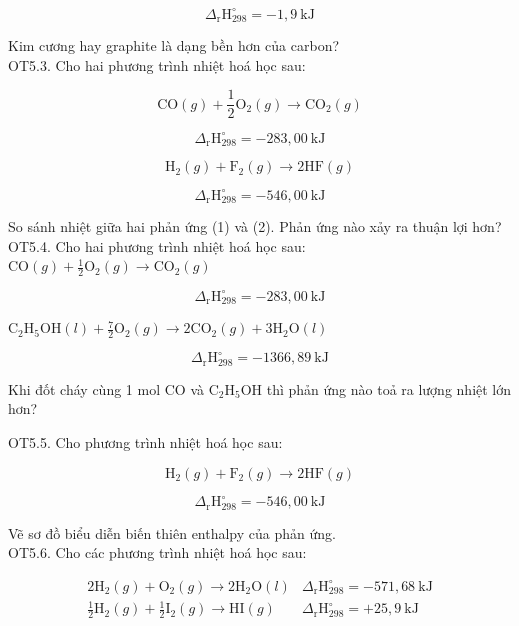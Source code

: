 \documentclass[10pt]{article}
\begin{document}
$$
\Delta_{\mathrm{r}} \mathrm{H}_{298}^{\circ}=-1,9 \mathrm{~kJ}
$$

Kim cương hay graphite là dạng bền hơn của carbon?\\
OT5.3. Cho hai phương trình nhiệt hoá học sau:


\begin{equation*}
\mathrm{CO}(g)+\frac{1}{2} \mathrm{O}_{2}(g) \rightarrow \mathrm{CO}_{2}(g) \tag{1}
\end{equation*}


$$
\Delta_{\mathrm{r}} \mathrm{H}_{298}^{\circ}=-283,00 \mathrm{~kJ}
$$


\begin{equation*}
\mathrm{H}_{2}(g)+\mathrm{F}_{2}(g) \rightarrow 2 \mathrm{HF}(g) \tag{2}
\end{equation*}


$$
\Delta_{\mathrm{r}} \mathrm{H}_{298}^{\circ}=-546,00 \mathrm{~kJ}
$$

So sánh nhiệt giữa hai phản ứng (1) và (2). Phản ứng nào xảy ra thuận lợi hơn?\\
OT5.4. Cho hai phương trình nhiệt hoá học sau:\\
$\mathrm{CO}(g)+\frac{1}{2} \mathrm{O}_{2}(g) \rightarrow \mathrm{CO}_{2}(g)$

$$
\Delta_{\mathrm{r}} \mathrm{H}_{298}^{\circ}=-283,00 \mathrm{~kJ}
$$

$\mathrm{C}_{2} \mathrm{H}_{5} \mathrm{OH}(l)+\frac{7}{2} \mathrm{O}_{2}(g) \rightarrow 2 \mathrm{CO}_{2}(g)+3 \mathrm{H}_{2} \mathrm{O}(l)$

$$
\Delta_{\mathrm{r}} \mathrm{H}_{298}^{\circ}=-1366,89 \mathrm{~kJ}
$$

Khi đốt cháy cùng 1 mol CO và $\mathrm{C}_{2} \mathrm{H}_{5} \mathrm{OH}$ thì phản ứng nào toả ra lượng nhiệt lớn hơn?

OT5.5. Cho phương trình nhiệt hoá học sau:

$$
\mathrm{H}_{2}(g)+\mathrm{F}_{2}(g) \rightarrow 2 \mathrm{HF}(g)
$$

$$
\Delta_{\mathrm{r}} \mathrm{H}_{298}^{\circ}=-546,00 \mathrm{~kJ}
$$

Vẽ sơ đồ biểu diễn biến thiên enthalpy của phản ứng.\\
OT5.6. Cho các phương trình nhiệt hoá học sau:

$$
\begin{array}{ll}
2 \mathrm{H}_{2}(g)+\mathrm{O}_{2}(g) \rightarrow 2 \mathrm{H}_{2} \mathrm{O}(l) & \Delta_{\mathrm{r}} \mathrm{H}_{298}^{\circ}=-571,68 \mathrm{~kJ} \\
\frac{1}{2} \mathrm{H}_{2}(g)+\frac{1}{2} \mathrm{I}_{2}(g) \rightarrow \mathrm{HI}(g) & \Delta_{\mathrm{r}} \mathrm{H}_{298}^{\circ}=+25,9 \mathrm{~kJ}
\end{array}
$$
\end{document}
